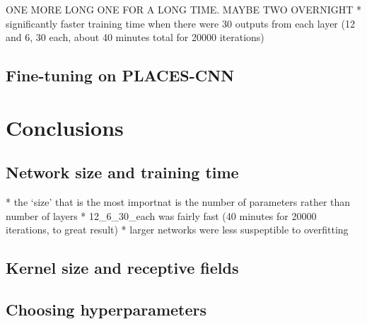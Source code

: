 \documentclass[10pt]{article}
\begin{document}
\begin{table}[!ht]
\centering
{}
\caption{Summary of top-1 and top-5 accuracy results on two-layer networks after 20000 iterations}
\label{tbl:twolayer}
\end{table}

ONE MORE LONG ONE FOR A LONG TIME. MAYBE TWO OVERNIGHT 
* significantly faster training time when there were 30 outputs from each layer (12 and 6, 30 each, about 40 minutes total for 20000 iterations)

\subsection{Fine-tuning on PLACES-CNN}



\section{Conclusions}

\subsection{Network size and training time}

* the `size' that is the most importnat is the number of parameters rather than number of layers
* 12_6_30_each was fairly fast (40 minutes for 20000 iterations, to great result)
* larger networks were less suspeptible to overfitting 

\subsection{Kernel size and receptive fields}



\subsection{Choosing hyperparameters}
\end{document}

